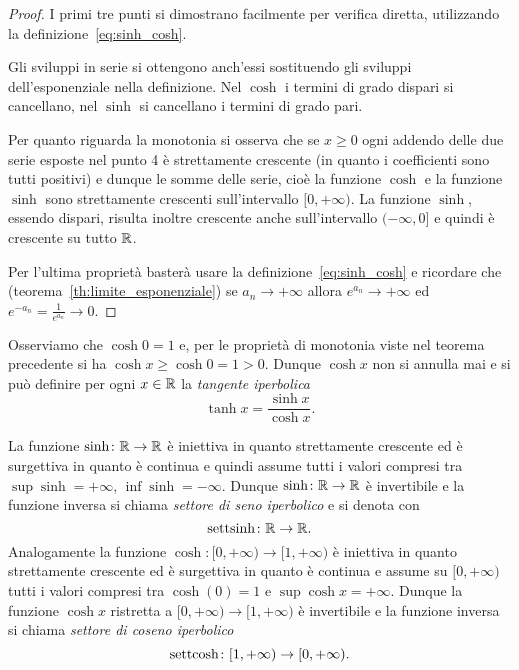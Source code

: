 \begin{proof}
I primi tre punti si dimostrano facilmente per verifica diretta,
utilizzando la definizione~\eqref{eq:sinh_cosh}.

Gli sviluppi in serie si ottengono anch'essi sostituendo
gli sviluppi dell'esponenziale nella definizione.
Nel $\cosh$ i termini di grado dispari si cancellano, nel $\sinh$ si cancellano
i termini di grado pari.

Per quanto riguarda la monotonia si osserva che se $x\ge 0$ ogni
addendo delle due serie esposte nel punto 4 è strettamente crescente
(in quanto i coefficienti sono tutti positivi) e dunque le somme delle serie,
cioè la funzione $\cosh$ e la funzione $\sinh$ sono strettamente crescenti
sull'intervallo $[0,+\infty)$. La funzione $\sinh$, essendo dispari,
risulta inoltre crescente anche sull'intervallo $(-\infty,0]$ e quindi
è crescente su tutto $\mathbb R$.

Per l'ultima proprietà basterà usare la definizione~\eqref{eq:sinh_cosh}
e ricordare che (teorema~\ref{th:limite_esponenziale})
se $a_n\to +\infty$ allora
$e^{a_n}\to +\infty$ ed $e^{-a_n}=\frac{1}{e^{a_n}} \to 0$.
\end{proof}

Osserviamo che $\cosh 0 = 1$ e, per le proprietà di monotonia viste nel teorema
precedente si ha $\cosh x \ge \cosh 0 = 1 > 0$. Dunque $\cosh x$ non si annulla
mai e si può definire per ogni $x\in \mathbb R$ la \emph{tangente iperbolica}
\mymargin{$\tanh$}
\[
 \tanh x = \frac{\sinh x}{\cosh x}.
\]

La funzione $\sinh\colon \mathbb R\to\mathbb R$ è iniettiva in quanto strettamente crescente ed
è surgettiva in quanto è continua e quindi assume tutti i valori compresi tra
$\sup \sinh = +\infty$, $\inf \sinh = -\infty$. Dunque $\sinh\colon \mathbb R \to \mathbb R$
è invertibile e la funzione inversa si chiama \emph{settore di seno iperbolico}
e si denota con
\mymargin{$\settsinh$}
\[
  \operatorname{settsinh} \colon \mathbb R \to \mathbb R.
\]
Analogamente la funzione $\cosh\colon [0,+\infty)\to [1,+\infty)$ è
iniettiva in quanto strettamente crescente ed è surgettiva in quanto
è continua e assume su $[0,+\infty)$ tutti i valori compresi tra $\cosh(0)=1$ e
$\sup \cosh x = +\infty$.
Dunque la funzione $\cosh x$ ristretta a $[0,+\infty)\to [1,+\infty)$
è invertibile e la funzione inversa si chiama \emph{settore di coseno iperbolico}
\mymargin{$\settcosh$}
\[
 \operatorname{settcosh} \colon [1,+\infty)\to [0,+\infty).
\]

